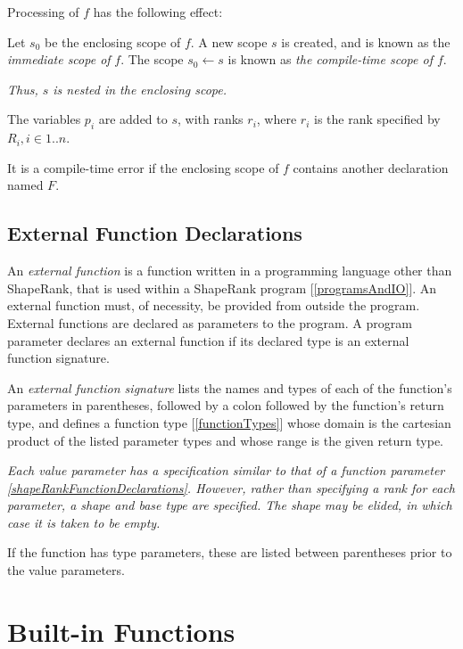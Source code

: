 \documentclass{article}
\begin{document}
Processing of $f$  has the following effect:

 Let $s_0$ be the enclosing scope of $f$. 
A new scope $s$ is created, and is known as the {\em immediate scope of} $f$. The scope $s_0 \leftarrow s$ is known as {\em the compile-time scope of $f$}.

{\em Thus, $s$ is nested in the enclosing scope.}

The variables $p_i$ are added to $s$, with ranks $r_i$, where $r_i$ is the rank specified by $R_i, i \in 1..n$.

It is a compile-time error if the enclosing scope of $f$ contains another declaration named $F$.

\subsection{External Function Declarations}
\label{externalFunctionDeclarations}

An {\em external function} is a function written in a programming language other than ShapeRank, that is used within a ShapeRank program [\ref{programsAndIO}].
An external function must, of necessity, be provided from outside the program. External functions are declared as parameters to the program.  A program parameter declares an external function if its declared type is an external function signature.  

\ExternalFunctionSignature{}
\ExternalFunctionParameterList
\ExternalFunctionParameter
\ExternalFunctionTypeSigSuffix
\TypeParameterList
\TypeParameter

An {\em external function signature} lists the names and types of each of the function's parameters in parentheses, followed by a colon followed by the function's return type, and defines a  function type [\ref{functionTypes}] whose domain is the cartesian product of the listed parameter types and whose range is the given return type.

{\em Each value parameter has a specification similar to that of a function parameter \ref{shapeRankFunctionDeclarations}. However, rather than specifying a rank for each parameter, a shape and base type are specified. The shape may be elided, in which case it is taken to be empty.
} 

If the function has type parameters, these are listed between parentheses prior to the value parameters.


\section{Built-in Functions}
\label{builtinFunctions}
\end{document}
